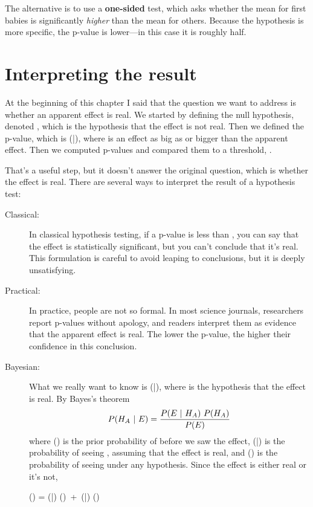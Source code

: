 \documentclass[12pt]{book}
\begin{document}
The alternative is to use a {\bf one-sided} test, which asks whether
the mean for first babies is significantly {\em higher} than
the mean for others.  Because the hypothesis is more specific, the
p-value is lower---in this case it is roughly half.


\section{Interpreting the result}

At the beginning of this chapter I said that the question we want to
address is whether an apparent effect is real.  We started by defining
the null hypothesis, denoted \HH{}, which is the hypothesis that
the effect is not real.  Then we defined the p-value, which is
\Prob(\E|\HH{}), where \E is an effect as big as or bigger
than the apparent effect.  Then we computed p-values and compared them
to a threshold, \myalpha.

That's a useful step, but it doesn't answer the original question,
which is whether the effect is real.  There are several ways to
interpret the result of a hypothesis test:

\begin{description}

\item[Classical:] In classical hypothesis testing, if a p-value
  is less than \myalpha, you can say that the effect is statistically
  significant, but you can't conclude that it's real.  This
  formulation is careful to avoid leaping to conclusions, but it is
  deeply unsatisfying.

\item[Practical:] In practice, people are not so formal.  In most
  science journals, researchers report p-values without apology, and
  readers interpret them as evidence that the apparent effect is real.
  The lower the p-value, the higher their confidence in this
  conclusion.

\item[Bayesian:] What we really want to know is \Prob(\HH{}|\E), 
  where \HH{} is the hypothesis that the effect is real.  
  By Bayes's theorem
  \[ P(H_A ~|~ E) = \frac{P(E ~|~ H_A) ~ P(H_A)}{P(E)} \]
  where \Prob(\HH{}) is the prior probability of \HH{} before 
  we saw the
  effect, \Prob(\E|\HH{}) is the probability of seeing \E, 
  assuming that
  the effect is real, and \Prob(\E) is the probability of seeing \E
  under any hypothesis.  Since the effect is either real or it's not,
  
  \quad \Prob(\E) = \Prob(\E|\HH{}) \Prob(\HH{})~+~\Prob(\E|\HH{}) \Prob(\HH{})

\end{description}
\end{document}
